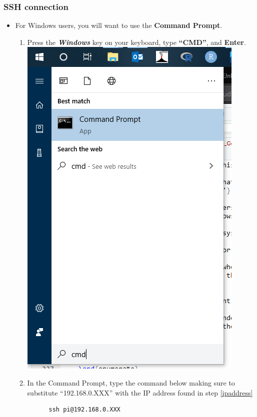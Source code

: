 \documentclass{article}
\begin{document}
\subsubsection{SSH connection}
\label{ssh}

\begin{itemize}
    \item For Windows users, you will want to use the \textbf{Command Prompt}.
    \begin{enumerate}
      \item Press the \textbf{\textit{Windows}} key on your keyboard, type \textbf{``CMD''}, and \textbf{Enter}.
\newline
\newline
\includegraphics[scale=0.70]{cmd}
      \item In the Command Prompt, type the command below making sure to substitute ``192.168.0.XXX'' with the IP address found in step \ref{ipaddress}
      \begin{lstlisting}
      ssh pi@192.168.0.XXX 
      \end{lstlisting}

\end{enumerate}
\end{itemize}
\end{document}
